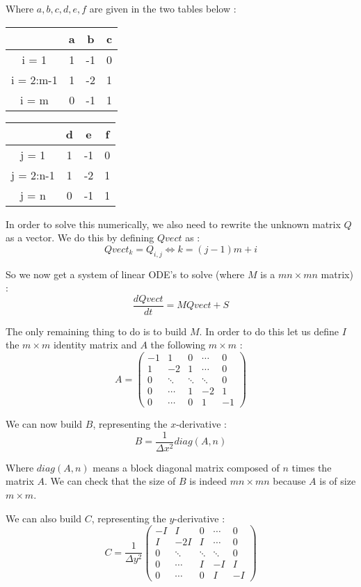 Where $a,b,c,d,e,f$ are given in the two tables below : 
\begin{center}
\begin{tabular}{|c|c|c|c|}
\hline 
 & a & b & c \\ 
\hline 
i = 1 & 1 & -1 & 0 \\ 
\hline 
i = 2:m-1 & 1 & -2 & 1 \\ 
\hline 
i = m & 0 & -1 & 1 \\ 
\hline 
\end{tabular} 
\begin{tabular}{|c|c|c|c|}
\hline 
 & d & e & f \\ 
\hline 
j = 1 & 1 & -1 & 0 \\ 
\hline 
j = 2:n-1 & 1 & -2 & 1 \\ 
\hline 
j = n & 0 & -1 & 1 \\ 
\hline 
\end{tabular} 
\end{center}

In order to solve this numerically, we also need to rewrite the unknown matrix $Q$ as a vector. We do this by defining $Qvect$ as :
$$Qvect_k = Q_{i,j}   \iff k = (j-1)m + i$$

So we now get a system of linear ODE's to solve (where $M$ is a $mn \times mn$ matrix) : 
$$\frac{dQvect}{dt} = MQvect + S$$

The only remaining thing to do is to build $M$. In order to do this let us define $I$ the $m\times m $ identity matrix and $A$ the following $m\times m $ : 
$$A = \left(\begin{array}{ccccc}
-1 & 1 & 0 & \cdots & 0 \\ 
1 & -2 & 1 & \cdots & 0 \\ 
0& \ddots & \ddots & \ddots & 0 \\ 
0 & \cdots & 1 & -2 & 1 \\
0 & \cdots & 0 & 1 & -1
\end{array}\right) $$

We can now build $B$, representing the $x$-derivative : 
$$B = \frac{1}{\Delta x^2}diag(A,n)$$

Where $diag(A,n)$ means a block diagonal matrix composed of $n$ times the matrix $A$. We can check that the size of $B$ is indeed $mn \times mn$ because $A$ is of size $m \times m$.

We can also build $C$, representing the $y$-derivative : 
$$C = \frac{1}{\Delta y^2}\left(\begin{array}{ccccc}
-I & I & 0 & \cdots & 0 \\ 
I & -2I & I & \cdots & 0 \\ 
0& \ddots & \ddots & \ddots & 0 \\ 
0 & \cdots & I & -I & I \\
0 & \cdots & 0 & I & -I
\end{array}\right) $$

